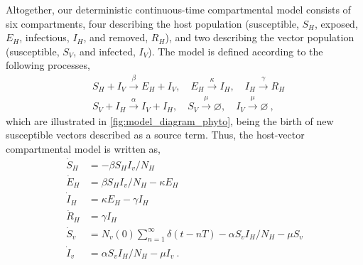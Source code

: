 Altogether, our deterministic continuous-time compartmental model consists
of six compartments, four describing the host population (susceptible, $S_H$,
exposed, $E_H$, infectious, $I_H$, and removed, $R_H$), and two describing the
vector population (susceptible, $S_V$, and infected, $I_V$). The model is
defined according to the following processes,
\begin{equation}\label{eq:scheme_infection_phyto}
    \begin{aligned}
         & S_H+I_V \stackrel{\beta}{\rightarrow} E_H + I_V, \quad
        E_H \stackrel{\kappa}{\rightarrow} I_H, \quad
        I_H  \stackrel{\gamma}{\rightarrow} R_H                      \\
         & S_V+I_H \stackrel{\alpha}{\rightarrow} I_V+I_H, \quad S_V
        \stackrel{\mu}{\rightarrow} \varnothing, \quad I_V
        \stackrel{\mu}{\rightarrow}
        \varnothing
        \ ,
    \end{aligned}
\end{equation}
which are illustrated in \cref{fig:model_diagram_phyto}, being the birth of new
susceptible vectors described as a source term.
Thus, the host-vector compartmental model is written as,
\begin{equation}\label{eq:SEIR_v}
    \begin{aligned}
        \dot{S}_H & =-\beta S_H I_v / N_H                                   \\
        \dot{E}_H & =\beta S_H I_v / N_H - \kappa E_H                       \\
        \dot{I}_H & =\kappa E_H - \gamma I_H                                \\
        \dot{R}_H & =\gamma I_H                                             \\
        \dot{S}_v & = N_v(0)\sum_{n=1}^{\infty}\delta(t-nT) -\alpha S_v I_H
        / N_H - \mu S_v                                                     \\
        \dot{I}_v & =\alpha S_v I_H / N_H - \mu I_v \ .
    \end{aligned}
\end{equation}

